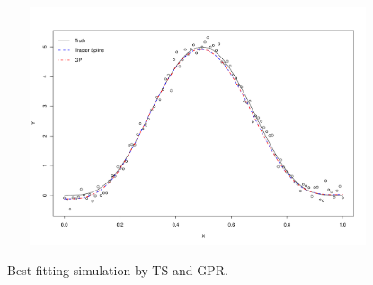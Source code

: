 \begin{figure}[!htb]  
	\centering
	\includegraphics[width=12cm,height=7cm]{Chapters/03GPR/plot/sim_cov} \\
	\caption{Best fitting simulation by TS and GPR.}
\end{figure}


